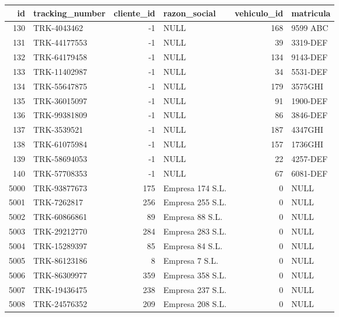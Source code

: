 \documentclass[a4paper,11pt]{article}
\begin{document}
\begin{Form}
\begin{enumerate}[leftmargin=*, label=\textbf{Pregunta \arabic*:}]
    \medskip
    \begin{tabular}{|r|l|r|l|r|l|}
        \hline
        \textbf{id} & \textbf{tracking\_number} & \textbf{cliente\_id} & \textbf{razon\_social} & \textbf{vehiculo\_id} & \textbf{matricula} \\
        \hline
        130  & TRK-4043462  & -1  & NULL             & 168 & 9599 ABC  \\
        131  & TRK-44177553 & -1  & NULL             &  39 & 3319-DEF  \\
        132  & TRK-64179458 & -1  & NULL             & 134 & 9143-DEF  \\
        133  & TRK-11402987 & -1  & NULL             &  34 & 5531-DEF  \\
        134  & TRK-55647875 & -1  & NULL             & 179 & 3575GHI   \\
        135  & TRK-36015097 & -1  & NULL             &  91 & 1900-DEF  \\
        136  & TRK-99381809 & -1  & NULL             &  86 & 3846-DEF  \\
        137  & TRK-3539521  & -1  & NULL             & 187 & 4347GHI   \\
        138  & TRK-61075984 & -1  & NULL             & 157 & 1736GHI   \\
        139  & TRK-58694053 & -1  & NULL             &  22 & 4257-DEF  \\
        140  & TRK-57708353 & -1  & NULL             &  67 & 6081-DEF  \\
        5000 & TRK-93877673 & 175 & Empresa 174 S.L. &   0 & NULL      \\
        5001 & TRK-7262817  & 256 & Empresa 255 S.L. &   0 & NULL      \\
        5002 & TRK-60866861 &  89 & Empresa 88 S.L.  &   0 & NULL      \\
        5003 & TRK-29212770 & 284 & Empresa 283 S.L. &   0 & NULL      \\
        5004 & TRK-15289397 &  85 & Empresa 84 S.L.  &   0 & NULL      \\
        5005 & TRK-86123186 &   8 & Empresa 7 S.L.   &   0 & NULL      \\
        5006 & TRK-86309977 & 359 & Empresa 358 S.L. &   0 & NULL      \\
        5007 & TRK-19436475 & 238 & Empresa 237 S.L. &   0 & NULL      \\
        5008 & TRK-24576352 & 209 & Empresa 208 S.L. &   0 & NULL      \\
        \hline
    \end{tabular}
    \medskip




\end{enumerate}
\end{Form}
\end{document}
